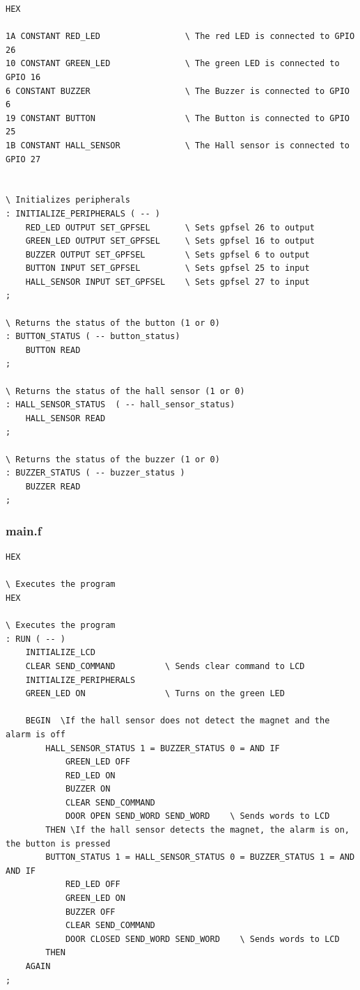 \documentclass[]{article}
\begin{document}
\begin{verbatim}
HEX

1A CONSTANT RED_LED                 \ The red LED is connected to GPIO 26
10 CONSTANT GREEN_LED               \ The green LED is connected to GPIO 16
6 CONSTANT BUZZER                   \ The Buzzer is connected to GPIO 6
19 CONSTANT BUTTON                  \ The Button is connected to GPIO 25
1B CONSTANT HALL_SENSOR             \ The Hall sensor is connected to GPIO 27


\ Initializes peripherals 
: INITIALIZE_PERIPHERALS ( -- )
    RED_LED OUTPUT SET_GPFSEL       \ Sets gpfsel 26 to output 
    GREEN_LED OUTPUT SET_GPFSEL     \ Sets gpfsel 16 to output 
    BUZZER OUTPUT SET_GPFSEL        \ Sets gpfsel 6 to output 
    BUTTON INPUT SET_GPFSEL         \ Sets gpfsel 25 to input 
    HALL_SENSOR INPUT SET_GPFSEL    \ Sets gpfsel 27 to input 
;

\ Returns the status of the button (1 or 0)
: BUTTON_STATUS ( -- button_status)
    BUTTON READ 
;

\ Returns the status of the hall sensor (1 or 0)
: HALL_SENSOR_STATUS  ( -- hall_sensor_status)
    HALL_SENSOR READ
;

\ Returns the status of the buzzer (1 or 0)
: BUZZER_STATUS ( -- buzzer_status )
    BUZZER READ
;
\end{verbatim}

\subsubsection{main.f}

\begin{verbatim}
HEX

\ Executes the program
HEX

\ Executes the program
: RUN ( -- )
    INITIALIZE_LCD
    CLEAR SEND_COMMAND          \ Sends clear command to LCD
    INITIALIZE_PERIPHERALS      
    GREEN_LED ON                \ Turns on the green LED
    
    BEGIN  \If the hall sensor does not detect the magnet and the alarm is off
        HALL_SENSOR_STATUS 1 = BUZZER_STATUS 0 = AND IF   
            GREEN_LED OFF       
            RED_LED ON 
            BUZZER ON
            CLEAR SEND_COMMAND
            DOOR OPEN SEND_WORD SEND_WORD    \ Sends words to LCD
        THEN \If the hall sensor detects the magnet, the alarm is on, the button is pressed  
        BUTTON_STATUS 1 = HALL_SENSOR_STATUS 0 = BUZZER_STATUS 1 = AND AND IF
            RED_LED OFF             
            GREEN_LED ON 
            BUZZER OFF
            CLEAR SEND_COMMAND
            DOOR CLOSED SEND_WORD SEND_WORD    \ Sends words to LCD
        THEN
    AGAIN
;

\end{verbatim}
\end{document}
